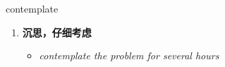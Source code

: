 
\begin{frame}
{\huge contemplate}
\begin{center}
\begin{enumerate}\Large
  \item \textbf{沉思，仔细考虑}
  \begin{itemize}
    \item \em{\Large{contemplate the problem for several hours}}
  \end{itemize}
\end{enumerate}
\end{center}
\end{frame}
